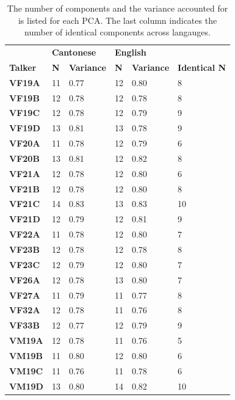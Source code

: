 \begin{table}[htbp]
    \caption{The number of components and the variance accounted for is listed for each PCA. The last column indicates the number of identical components across langauges.}
\label{ch3:tab:componentcount}
\centering
{\small 
    \begin{tabular}{llllll}
    
    \toprule
     & \multicolumn{2}{l}{\textbf{Cantonese}} & \multicolumn{2}{l}{\textbf{English}} & \textbf{} \\
    \textbf{Talker} & \textbf{N} & \textbf{Variance} & \textbf{N} & \textbf{Variance} & \textbf{Identical N} \\
    \midrule
    \textbf{VF19A} & 11 & 0.77 & 12 & 0.80 & 8 \\
    \textbf{VF19B} & 12 & 0.78 & 12 & 0.78 & 8 \\
    \textbf{VF19C} & 12 & 0.78 & 12 & 0.79 & 9 \\
    \textbf{VF19D} & 13 & 0.81 & 13 & 0.78 & 9 \\
    \textbf{VF20A} & 11 & 0.78 & 12 & 0.79 & 6 \\
    \textbf{VF20B} & 13 & 0.81 & 12 & 0.82 & 8 \\
    \textbf{VF21A} & 12 & 0.78 & 12 & 0.80 & 6 \\
    \textbf{VF21B} & 12 & 0.78 & 12 & 0.80 & 8 \\
    \textbf{VF21C} & 14 & 0.83 & 13 & 0.83 & 10 \\
    \textbf{VF21D} & 12 & 0.79 & 12 & 0.81 & 9 \\
    \textbf{VF22A} & 11 & 0.78 & 12 & 0.80 & 7 \\
    \textbf{VF23B} & 12 & 0.78 & 12 & 0.78 & 8 \\
    \textbf{VF23C} & 12 & 0.79 & 12 & 0.80 & 7 \\
    \textbf{VF26A} & 12 & 0.78 & 13 & 0.80 & 7 \\
    \textbf{VF27A} & 11 & 0.79 & 11 & 0.77 & 8 \\
    \textbf{VF32A} & 12 & 0.78 & 11 & 0.76 & 8 \\
    \textbf{VF33B} & 12 & 0.77 & 12 & 0.79 & 9 \\
    \textbf{VM19A} & 12 & 0.78 & 11 & 0.76 & 5 \\
    \textbf{VM19B} & 11 & 0.80 & 12 & 0.80 & 6 \\
    \textbf{VM19C} & 11 & 0.76 & 11 & 0.78 & 6 \\
    \textbf{VM19D} & 13 & 0.80 & 14 & 0.82 & 10 \\

\end{tabular}}
\end{table}
